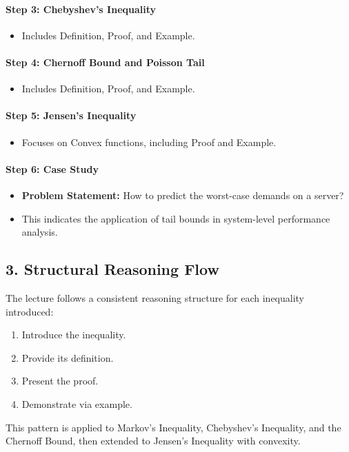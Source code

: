 \documentclass{article}
\begin{document}
\paragraph{Step 3: Chebyshev’s Inequality}
\begin{itemize}
    \item Includes Definition, Proof, and Example.
\end{itemize}

\paragraph{Step 4: Chernoff Bound and Poisson Tail}
\begin{itemize}
    \item Includes Definition, Proof, and Example.
\end{itemize}

\paragraph{Step 5: Jensen’s Inequality}
\begin{itemize}
    \item Focuses on Convex functions, including Proof and Example.
\end{itemize}

\paragraph{Step 6: Case Study}
\begin{itemize}
    \item \textbf{Problem Statement:} How to predict the worst-case demands on a server?
    \item This indicates the application of tail bounds in system-level performance analysis.
\end{itemize}

\subsection*{3. Structural Reasoning Flow}
The lecture follows a consistent reasoning structure for each inequality introduced:
\begin{enumerate}
    \item Introduce the inequality.
    \item Provide its definition.
    \item Present the proof.
    \item Demonstrate via example.
\end{enumerate}
This pattern is applied to Markov’s Inequality, Chebyshev’s Inequality, and the Chernoff Bound, then extended to Jensen’s Inequality with convexity.
\end{document}
